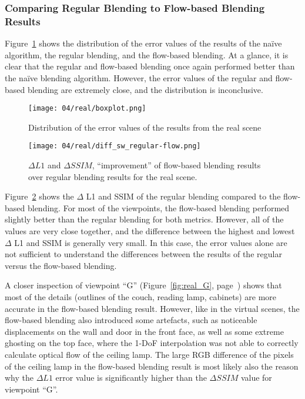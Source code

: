 \subsubsection{Comparing Regular Blending to Flow-based Blending Results}
Figure~\ref{fig:real_boxplot} shows the distribution of the error values of the results of the na\"ive algorithm, the regular blending, and the flow-based blending. At a glance, it is clear that the regular and flow-based blending once again performed better than the na\"ive blending algorithm. However, the error values of the regular and flow-based blending are extremely close, and the distribution is inconclusive. 

\begin{figure}
		\centering
		\texttt{[image: 04/real/boxplot.png]}
		\caption{Distribution of the error values of the results from the real scene}
		\label{fig:real_boxplot}
\end{figure}
\begin{figure}
		\centering
		\texttt{[image: 04/real/diff\_sw\_regular-flow.png]}
		\caption{$\Delta L1$ and $\Delta SSIM$, ``improvement'' of flow-based blending results over regular blending results for the real scene.}
		\label{fig:real_diff}
\end{figure}

Figure~\ref{fig:real_diff} shows the $\Delta$ L1 and SSIM of the regular blending compared to the flow-based blending.
For most of the viewpoints, the flow-based blending performed slightly better than the regular blending for both metrics. However, all of the values are very close together, and the difference between the highest and lowest $\Delta$ L1 and SSIM is generally very small. In this case, the error values alone are not sufficient to understand the differences between the results of the regular versus the flow-based blending.

A closer inspection of viewpoint ``G'' (Figure~\ref{fig:real_G}, page~\pageref{fig:real_G}) shows that most of the details (outlines of the couch, reading lamp, cabinets) are more accurate in the flow-based blending result. However, like in the virtual scenes, the flow-based blending also introduced some artefacts, such as noticeable displacements on the wall and door in the front face, as well as some extreme ghosting on the top face, where the 1-DoF interpolation was not able to correctly calculate optical flow of the ceiling lamp. The large RGB difference of the pixels of the ceiling lamp in the flow-based blending result is most likely also the reason why the $\Delta L1$ error value is significantly higher than the $\Delta SSIM$ value for viewpoint ``G''.


